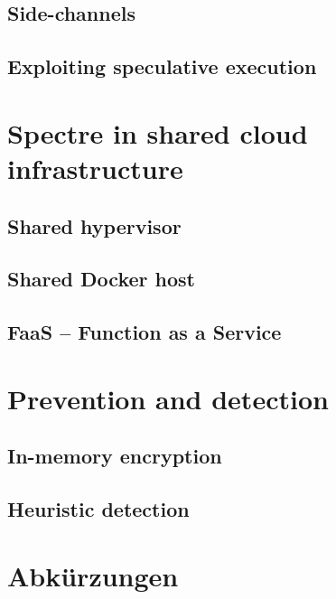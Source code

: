 \documentclass[conference,compsoc,final,a4paper]{IEEEtran}
\begin{document}
\subsection{Side-channels}

\subsection{Exploiting speculative execution}

\section{Spectre in shared cloud infrastructure}

\subsection{Shared hypervisor}

\subsection{Shared Docker host}

\subsection{FaaS -- Function as a Service}

\section{Prevention and detection}
\subsection{In-memory encryption}
\subsection{Heuristic detection}

\section*{Abkürzungen}

\begin{acronym}[IEEE]
\end{acronym}

\printbibliography
\end{document}
